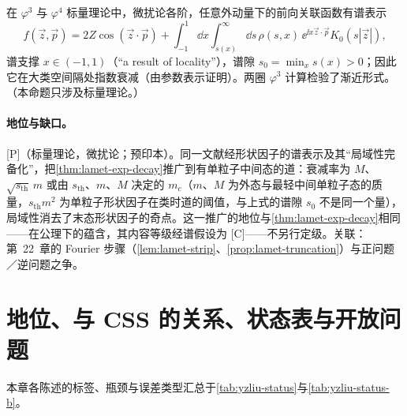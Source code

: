 \begin{proposition}\label{prop:yzliu-decay-extensions}
在 $\varphi^3$ 与 $\varphi^4$ 标量理论中，微扰论各阶，任意外动量下的前向关联函数有谱表示
\begin{equation}\label{eq:yzliu-decay-spectral}
f(\vec z,\vec p)=2Z\cos(\vec z\cdot\vec p)+\int_{-1}^1\dd x\int_{s(x)}^\infty\dd s\,\rho(s,x)\,\ee^{\ii x\vec z\cdot\vec p}K_0(s|\vec z|),
\end{equation}
谱支撑 $x\in(-1,1)$（“a result of locality”），谱隙 $s_0=\min_xs(x)>0$；因此它在大类空间隔处指数衰减（由参数表示证明\cite[第~5.3~节]{Ji:2026vir}）。两圈 $\varphi^3$ 计算检验了渐近形式。（本命题只涉及标量理论。）
\end{proposition}

\paragraph{地位与缺口。}[P]（标量理论，微扰论；预印本\cite[第~1--2、5、6~节]{Ji:2026vir}）。同一文献经形状因子的谱表示及其“局域性完备化”，把\cref{thm:lamet-exp-decay}推广到有单粒子中间态的道：衰减率为 $M$、$\sqrt{s_{\mathrm{th}}}\,m$ 或由 $s_{\mathrm{th}}$、$m$、$M$ 决定的 $m_c$（$m$、$M$ 为外态与最轻中间单粒子态的质量，$s_{\mathrm{th}}m^2$ 为单粒子形状因子在类时道的阈值，与上式的谱隙 $s_0$ 不是同一个量）\cite[式~(5.19)--(5.23)]{Ji:2026vir}，局域性消去了末态形状因子的奇点。这一推广的地位与\cref{thm:lamet-exp-decay}相同——在公理下的蕴含，其内容等级经谱假设为 [C]——不另行定级。关联：第~22~章的 Fourier 步骤（\cref{lem:lamet-strip}、\cref{prop:lamet-truncation}）与正问题／逆问题之争。

\section{地位、与 CSS 的关系、状态表与开放问题}\label{sec:yzliu-status}

本章各陈述的标签、瓶颈与误差类型汇总于\cref{tab:yzliu-status}与\cref{tab:yzliu-status-b}。

